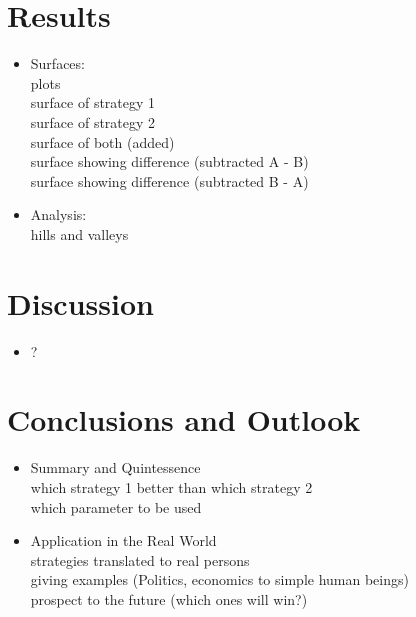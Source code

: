 \documentclass{article}
\begin{document}
\section{Results}
\begin{itemize}

	\item Surfaces:\\
		plots\\
		surface of strategy 1\\
		surface of strategy 2\\
		surface of both (added)\\
		surface showing difference (subtracted A - B)\\
		surface showing difference (subtracted B - A)\\

	\item Analysis:\\
		hills and valleys\\

\end{itemize}

\section{Discussion}
\begin{itemize}

	\item ?

\end{itemize}

\section{Conclusions and Outlook}
\begin{itemize}

	\item Summary and Quintessence\\
		which strategy 1 better than which strategy 2\\
		which parameter to be used\\

	\item Application in the Real World\\
		strategies translated to real persons\\
		giving examples (Politics, economics to simple human beings)\\
		prospect to the future (which ones will win?)

\end{itemize}
\end{document}
